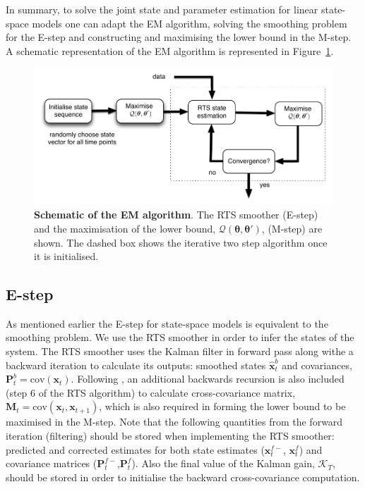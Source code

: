 \documentclass[review,authoryear,3p]{elsarticle}
\begin{document}
In summary, to solve the joint state and parameter estimation for linear state-space models one can adapt the EM algorithm, solving the smoothing problem for the E-step and constructing and maximising the lower bound in the M-step. A schematic representation of the EM algorithm is represented in Figure~\ref{fig:EMBlockDiagram}.  
\begin{figure}[!t]
\centering
\includegraphics[scale=1]{./Graph/EMBlockDiagram.pdf}
\caption{{\bf Schematic of the EM algorithm}. The RTS smoother (E-step) and the maximisation of the lower bound, $\mathcal Q(\boldsymbol \theta,\boldsymbol\theta')$, (M-step) are shown. The dashed box shows the iterative two step algorithm once it is initialised.}
\label{fig:EMBlockDiagram}
\end{figure}
  \subsection{E-step}
  As mentioned earlier the E-step for state-space models is equivalent to the smoothing problem. We use the RTS smoother in order to infer the states of the system. The RTS smoother uses the Kalman filter \cite{Kalman1960} in forward pass along withe a backward iteration to calculate its outputs: smoothed states $\hat{\mathbf x}^b_t$ and covariances, $\mathbf P^b_t=\mathrm{cov}(\mathbf{x}_t)$. Following \cite{Gibsona2005}, an additional backwards recursion is also included (step 6 of the RTS algorithm)	to calculate cross-covariance matrix, $\mathbf M_t=\mathrm{cov}(\mathbf{x}_{t},\mathbf{x}_{t+1})$, which is also required in forming the lower bound to be maximised in the M-step. Note that the following quantities from the forward iteration (filtering) should be stored when implementing the RTS smoother: predicted and corrected estimates for both state estimates ($\mathbf{x}_t^{f-}$, $\mathbf{x}_t^{f}$) and covariance matrices ($\mathbf P_t^{f-}$,$\mathbf P_t^f$). Also the final value of the Kalman gain, $\mathcal K_T$, should be stored in order to initialise the backward cross-covariance computation. 
\end{document}
